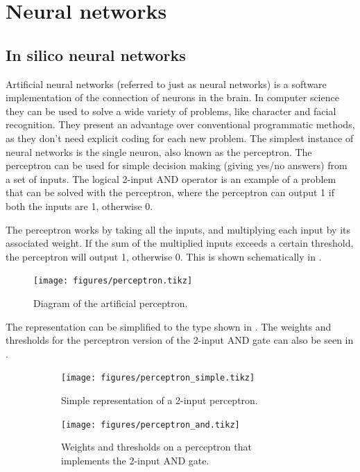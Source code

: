 \section{Neural networks}
\subsection{In silico neural networks}
Artificial neural networks (referred to just as neural networks) is a software implementation of the connection of neurons in the brain. In computer science they can be used to solve a wide variety of problems, like character and facial recognition. They present an advantage over conventional programmatic methods, as they don't need explicit coding for each new problem. The simplest instance of neural networks is the single neuron, also known as the perceptron. The perceptron can be used for simple decision making (giving yes/no answers) from a set of inputs. The logical 2-input AND operator is an example of a problem that can be solved with the perceptron, where the perceptron can output 1 if both the inputs are 1, otherwise 0.

The perceptron works by taking all the inputs, and multiplying each input by its associated weight. If the sum of the multiplied inputs exceeds a certain threshold, the perceptron will output 1, otherwise 0. This is shown schematically in .

\begin{figure}[H]
\texttt{[image: figures/perceptron.tikz]}
\caption{Diagram of the artificial perceptron.}
\label{perceptron}
\end{figure}

The representation can be simplified to the type shown in . The weights and thresholds for the perceptron version of the 2-input AND gate can also be seen in .

\begin{figure}[H]
  \begin{subfigure}[t]{.49\textwidth}
    \texttt{[image: figures/perceptron\_simple.tikz]}
    \caption{Simple representation of a 2-input perceptron.}
  \end{subfigure}
  \quad
  \begin{subfigure}[t]{.49\textwidth}
    \texttt{[image: figures/perceptron\_and.tikz]}  \caption{Weights and thresholds on a perceptron that implements the 2-input AND gate.}
  \end{subfigure}
  \caption{}
  \label{perceptron_simple}
\end{figure}

